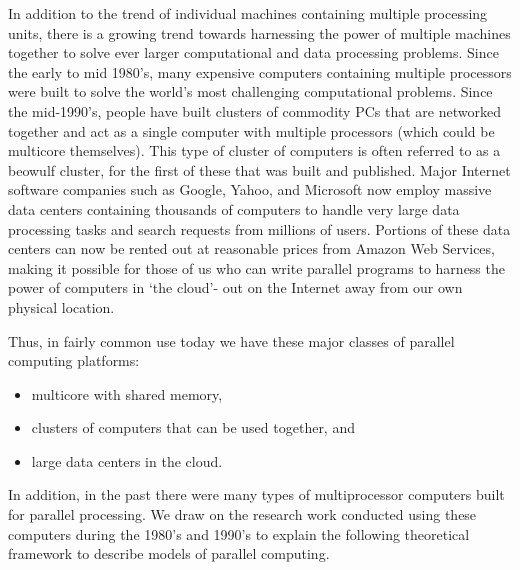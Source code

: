 \documentclass[letterpaper,10pt,openany,oneside]{sphinxmanual}
\begin{document}
In addition to the trend of individual machines containing multiple processing units, there is a growing trend towards harnessing the power of multiple machines together to solve ever larger computational and data processing problems.  Since the early to mid 1980’s, many expensive computers containing multiple processors were built to solve the world’s most challenging computational problems. Since the mid-1990’s, people have built clusters of commodity PCs that are networked together and act as a single computer with multiple processors (which could be multicore themselves). This type of cluster of computers is often referred to as a beowulf cluster, for the first of these that was built and published.  Major Internet software companies such as Google, Yahoo, and Microsoft now employ massive data centers containing thousands of computers to handle very large data processing tasks and search requests from millions of users.  Portions of these data centers can now be rented out at reasonable prices from Amazon Web Services, making it possible for those of us who can write parallel programs to harness the power of computers in ‘the cloud’- out on the Internet away from our own physical location.

Thus, in fairly common use today we have these major classes of parallel computing platforms:
\begin{itemize}
\item {} 
multicore with shared memory,

\item {} 
clusters of computers that can be used together, and

\item {} 
large data centers in the cloud.

\end{itemize}

In addition, in the past there were many types of multiprocessor computers built for parallel processing.  We draw on the research work conducted using these computers during the 1980’s and 1990’s to explain the following theoretical framework to describe models of parallel computing.
\end{document}
